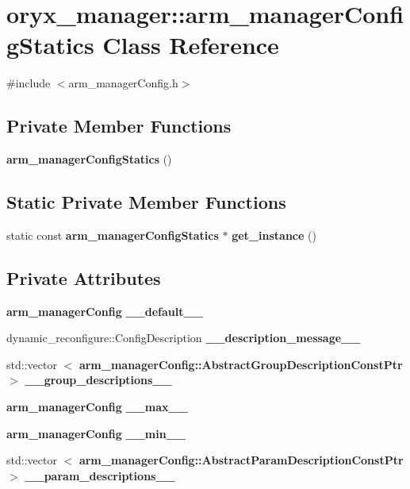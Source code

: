 \section{oryx\-\_\-manager\-:\-:arm\-\_\-manager\-Config\-Statics \-Class \-Reference}
\label{classoryx__manager_1_1arm__managerConfigStatics}


{\ttfamily \#include $<$arm\-\_\-manager\-Config.\-h$>$}

\subsection*{\-Private \-Member \-Functions}
\begin{DoxyCompactItemize}
\item 
{\bf arm\-\_\-manager\-Config\-Statics} ()
\end{DoxyCompactItemize}
\subsection*{\-Static \-Private \-Member \-Functions}
\begin{DoxyCompactItemize}
\item 
static const \*
{\bf arm\-\_\-manager\-Config\-Statics} $\ast$ {\bf get\-\_\-instance} ()
\end{DoxyCompactItemize}
\subsection*{\-Private \-Attributes}
\begin{DoxyCompactItemize}
\item 
{\bf arm\-\_\-manager\-Config} {\bf \-\_\-\-\_\-default\-\_\-\-\_\-}
\item 
dynamic\-\_\-reconfigure\-::\-Config\-Description {\bf \-\_\-\-\_\-description\-\_\-message\-\_\-\-\_\-}
\item 
std\-::vector\*
$<$ {\bf arm\-\_\-manager\-Config\-::\-Abstract\-Group\-Description\-Const\-Ptr} $>$ {\bf \-\_\-\-\_\-group\-\_\-descriptions\-\_\-\-\_\-}
\item 
{\bf arm\-\_\-manager\-Config} {\bf \-\_\-\-\_\-max\-\_\-\-\_\-}
\item 
{\bf arm\-\_\-manager\-Config} {\bf \-\_\-\-\_\-min\-\_\-\-\_\-}
\item 
std\-::vector\*
$<$ {\bf arm\-\_\-manager\-Config\-::\-Abstract\-Param\-Description\-Const\-Ptr} $>$ {\bf \-\_\-\-\_\-param\-\_\-descriptions\-\_\-\-\_\-}
\end{DoxyCompactItemize}
